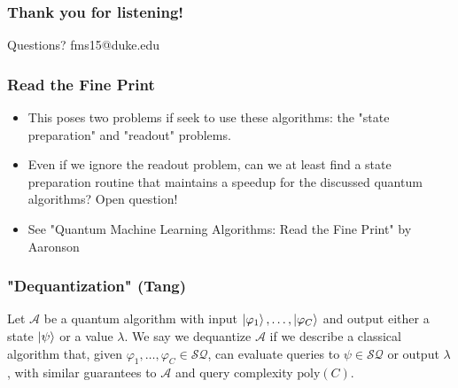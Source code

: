 \documentclass{beamer}
\newcommand\0{\mathbf{0}}
\newcommand\<{\langle}
\renewcommand\>{\rangle}
\renewcommand\phi{\varphi}
\begin{document}
\begin{frame}
\frametitle{Thank you for listening!}

Questions? fms15@duke.edu	
\end{frame}





\begin{frame}
\frametitle{Read the Fine Print}	
\begin{itemize}
\item This poses two problems if seek to use these algorithms: the "state preparation" and "readout" problems.
\item Even if we ignore the readout problem, can we at least find a state preparation routine that maintains a speedup for the discussed quantum algorithms? Open question!
\item See "Quantum Machine Learning Algorithms: Read the Fine Print" by Aaronson
\end{itemize}
\end{frame}

\begin{frame}
\frametitle{"Dequantization" (Tang)}
\begin{definition}
 Let $\mathcal{A}$ be a quantum algorithm with input $\ket{\phi_1},\ldots,\ket{\phi_C}$ and output either a state $\ket{\psi}$ or a value $\lambda$. We say we dequantize $\mathcal{A}$ if we describe a classical algorithm that, given $\phi_1,\ldots,\phi_C \in \mathcal{SQ}$, can evaluate queries to $\psi \in \mathcal{SQ}$ or output $\lambda$, with similar guarantees to $\mathcal{A}$ and query complexity $\text{poly}(C)$.	
\end{definition}
\end{frame}

 
\end{document}
